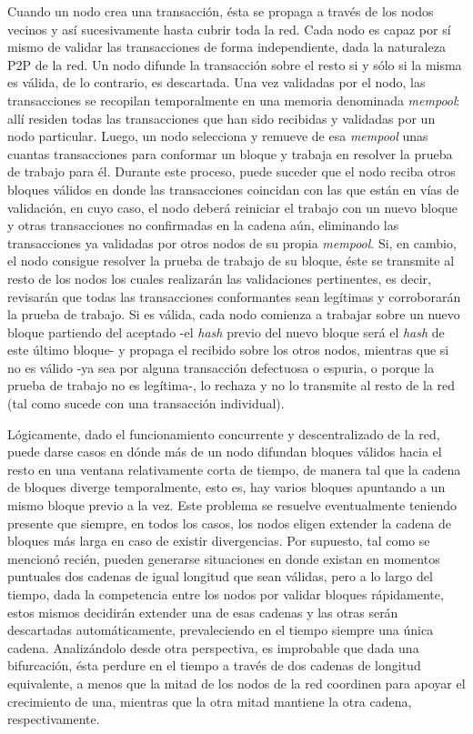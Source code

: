 Cuando un nodo crea una transacción, ésta se propaga a través de los nodos vecinos y así sucesivamente hasta cubrir toda la red. Cada nodo es capaz por sí mismo de validar las transacciones de forma independiente, dada la naturaleza P2P de la red. Un nodo difunde la transacción sobre el resto si y sólo si la misma es válida, de lo contrario, es descartada. Una vez validadas por el nodo, las transacciones se recopilan temporalmente en una memoria denominada \textit{mempool}: allí residen todas las transacciones que han sido recibidas y validadas por un nodo particular. Luego, un nodo selecciona y remueve de esa \textit{mempool} unas cuantas transacciones para conformar un bloque y trabaja en resolver la prueba de trabajo para él. Durante este proceso, puede suceder que el nodo reciba otros bloques válidos en donde las transacciones coincidan con las que están en vías de validación, en cuyo caso, el nodo deberá reiniciar el trabajo con un nuevo bloque y otras transacciones no confirmadas en la cadena aún, eliminando las transacciones ya validadas por otros nodos de su propia \textit{mempool}. Si, en cambio, el nodo consigue resolver la prueba de trabajo de su bloque, éste se transmite al resto de los nodos los cuales realizarán las validaciones pertinentes, es decir, revisarán que todas las transacciones conformantes sean legítimas y corroborarán la prueba de trabajo. Si es válida, cada nodo comienza a trabajar sobre un nuevo bloque partiendo del aceptado -el \textit{hash} previo del nuevo bloque será el \textit{hash} de este último bloque- y propaga el recibido sobre los otros nodos, mientras que si no es válido -ya sea por alguna transacción defectuosa o espuria, o porque la prueba de trabajo no es legítima-, lo rechaza y no lo transmite al resto de la red (tal como sucede con una transacción individual).

Lógicamente, dado el funcionamiento concurrente y descentralizado de la red, puede darse casos en dónde más de un nodo difundan bloques válidos hacia el resto en una ventana relativamente corta de tiempo, de manera tal que la cadena de bloques diverge temporalmente, esto es, hay varios bloques apuntando a un mismo bloque previo a la vez. Este problema se resuelve eventualmente teniendo presente que siempre, en todos los casos, los nodos eligen extender la cadena de bloques más larga en caso de existir divergencias. Por supuesto, tal como se mencionó recién, pueden generarse situaciones en donde existan en momentos puntuales dos cadenas de igual longitud que sean válidas, pero a lo largo del tiempo, dada la competencia entre los nodos por validar bloques rápidamente, estos mismos decidirán extender una de esas cadenas y las otras serán descartadas automáticamente, prevaleciendo en el tiempo siempre una única cadena. Analizándolo desde otra perspectiva, es improbable que dada una bifurcación, ésta perdure en el tiempo a través de dos cadenas de longitud equivalente, a menos que la mitad de los nodos de la red coordinen para apoyar el crecimiento de una, mientras que la otra mitad mantiene la otra cadena, respectivamente.

